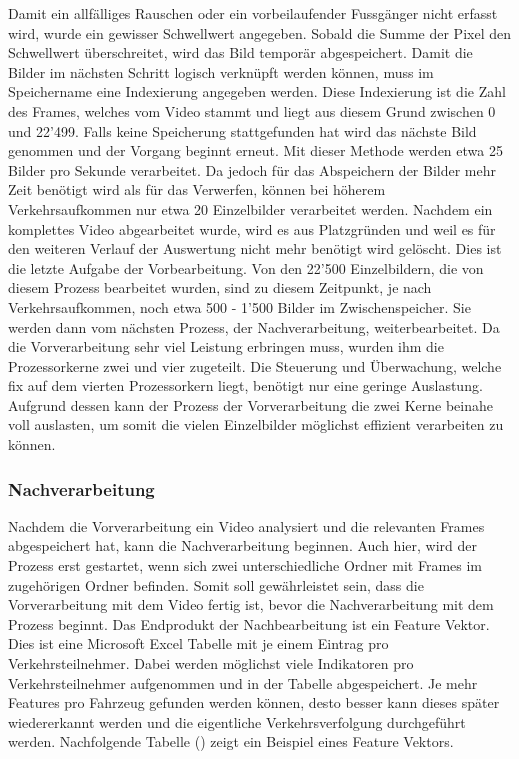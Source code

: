 Damit ein allfälliges Rauschen oder ein vorbeilaufender Fussgänger nicht erfasst wird, wurde ein gewisser Schwellwert angegeben. Sobald die Summe der Pixel den Schwellwert überschreitet, wird das Bild temporär abgespeichert. Damit die Bilder im nächsten Schritt logisch verknüpft werden können, muss im Speichername eine Indexierung angegeben werden. Diese Indexierung ist die Zahl des Frames, welches vom Video stammt und liegt aus diesem Grund zwischen 0 und 22'499. Falls keine Speicherung stattgefunden hat wird das nächste Bild genommen und der Vorgang beginnt erneut. Mit dieser Methode werden etwa 25 Bilder pro Sekunde verarbeitet. Da jedoch für das Abspeichern der Bilder mehr Zeit benötigt wird als für das Verwerfen, können bei höherem Verkehrsaufkommen nur etwa 20 Einzelbilder verarbeitet werden. Nachdem ein komplettes Video abgearbeitet wurde, wird es aus Platzgründen und weil es für den weiteren Verlauf der Auswertung nicht mehr benötigt wird gelöscht. Dies ist die letzte Aufgabe der Vorbearbeitung. Von den 22'500 Einzelbildern, die von diesem Prozess bearbeitet wurden, sind zu diesem Zeitpunkt, je nach Verkehrsaufkommen, noch etwa 500 - 1'500 Bilder im Zwischenspeicher. Sie werden dann vom nächsten Prozess, der Nachverarbeitung, weiterbearbeitet. Da die Vorverarbeitung sehr viel Leistung erbringen muss, wurden ihm die Prozessorkerne zwei und vier zugeteilt. Die Steuerung und Überwachung, welche fix auf dem vierten Prozessorkern liegt, benötigt nur eine geringe Auslastung. Aufgrund dessen kann der Prozess der Vorverarbeitung die zwei Kerne beinahe voll auslasten, um somit die vielen Einzelbilder möglichst effizient verarbeiten zu können.

\subsubsection{Nachverarbeitung}
Nachdem die Vorverarbeitung ein Video analysiert und die relevanten Frames abgespeichert hat, kann die Nachverarbeitung beginnen. Auch hier, wird der Prozess erst gestartet, wenn sich zwei unterschiedliche Ordner mit Frames im zugehörigen Ordner befinden. Somit soll gewährleistet sein, dass die Vorverarbeitung mit dem Video fertig ist, bevor die Nachverarbeitung mit dem Prozess beginnt. Das Endprodukt der Nachbearbeitung ist ein Feature Vektor. Dies ist eine Microsoft Excel Tabelle mit je einem Eintrag pro Verkehrsteilnehmer. Dabei werden möglichst viele Indikatoren pro Verkehrsteilnehmer aufgenommen und in der Tabelle abgespeichert. Je mehr Features pro Fahrzeug gefunden werden können, desto besser kann dieses später wiedererkannt werden und die eigentliche Verkehrsverfolgung durchgeführt werden. Nachfolgende Tabelle () zeigt ein Beispiel eines Feature Vektors.

